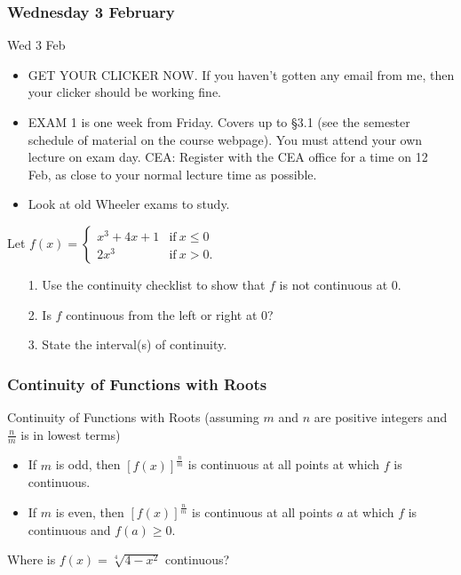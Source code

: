 \documentclass[cal1spr16Lectures.tex]{subfiles}
\begin{document}

\subsubsection{\bf Wednesday 3 February}
\begin{frame}[allowframebreaks]{Wed 3 Feb}
\begin{itemize}%
\item GET YOUR CLICKER NOW.  If you haven't gotten any email from me, then your clicker should be working fine.  	
\item EXAM 1 is one week from Friday.  Covers up to \S 3.1 (see the semester schedule of material on the course webpage).  \alert{You must attend your own lecture on exam day.}  CEA: Register with the CEA office for a time on 12 Feb, as close to your normal lecture time as possible.
\item Look at old Wheeler exams to study.
\end{itemize}
\end{frame}

\begin{frame}
\begin{ex}Let $f(x)=\begin{cases}
	x^3+4x+1 & \text{if}\ x \leq 0 \\
	2x^3 & \text{if}\ x>0.
	\end{cases}$
\begin{itemize}
\item[1.] Use the continuity checklist to show that $f$ is not continuous at 0.
\item[2.] Is $f$ continuous from the left or right at 0?
\item[3.] State the interval(s) of continuity.
\end{itemize}
\end{ex}
\end{frame}

\subsubsection{Continuity of Functions with Roots}

\begin{frame}{\small Continuity of Functions with Roots}{}
{\small (assuming $m$ and $n$ are positive integers and $\textstyle\frac{n}{m}$ is in lowest terms)}
\begin{itemize}
\item If $m$ is odd, then $[f(x)]^{\frac{n}{m}}$ is continuous at all points at which $f$ is continuous.
\item If $m$ is even, then $[f(x)]^{\frac{n}{m}}$ is continuous at all points $a$ at which $f$ is continuous \alert{and $f(a)\geq 0$}.
\end{itemize}
\begin{que}  Where is $f(x)=\sqrt[4]{4-x^2}$ continuous?\end{que}
\end{frame}
\end{document}
